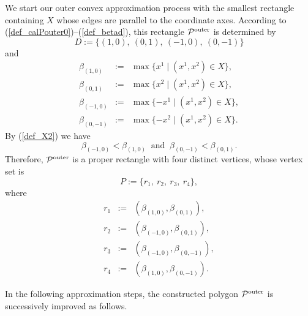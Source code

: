 \documentclass[12pt]{article}
\begin{document}
We start our outer convex approximation process with the smallest rectangle containing $X$ whose edges are parallel to the coordinate axes. According to (\ref{def_calPouter0})--(\ref{def_betad}), this rectangle ${\cal P}^{\rm outer}$ is determined by
\begin{equation}\label{def_D1}
D := \{(1, 0),\ (0, 1),\ (-1, 0),\ (0, -1)\}
\end{equation}
and
\begin{equation}\label{def_beta1}
\begin{array}{lcl}
\beta_{(1, 0)} &:=& \max\{x^1 \mid (x^1, x^2) \in X\}, \\
\beta_{(0, 1)} &:=& \max\{x^2 \mid (x^1, x^2) \in X\}, \\
\beta_{(-1, 0)} &:=& \max\{-x^1 \mid (x^1, x^2) \in X\}, \\
\beta_{(0, -1)} &:=& \max\{-x^2 \mid (x^1, x^2) \in X\}.
\end{array}
\end{equation}
By (\ref{def_X2}) we have
\begin{equation*}
\beta_{(-1, 0)} < \beta_{(1, 0)} \ \mbox{ and } \ \beta_{(0, -1)} < \beta_{(0, 1)}.
\end{equation*}
Therefore, ${\cal P}^{\rm outer}$ is a proper rectangle with four distinct vertices, whose vertex set is 
\begin{equation}\label{def_4r-2}
P := \{r_1,\ r_2,\ r_3,\ r_4\},
\end{equation}
where
\begin{equation}\label{def_4r-1}
\begin{array}{lcl}
r_1 &:=& (\beta_{(1, 0)}, \beta_{(0, 1)}), \\
r_2 &:=& (\beta_{(-1, 0)}, \beta_{(0, 1)}), \\
r_3 &:=& (\beta_{(-1, 0)}, \beta_{(0, -1)}), \\
r_4 &:=& (\beta_{(1, 0)}, \beta_{(0, -1)}).
\end{array}
\end{equation}

In the following approximation steps, the constructed polygon ${\cal P}^{\rm outer}$ is successively improved as follows.
\end{document}

